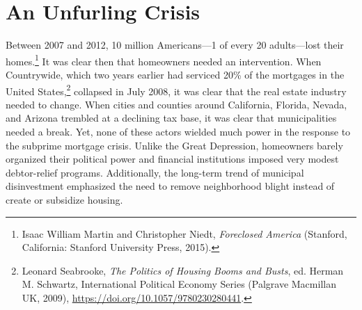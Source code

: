 \documentclass[12pt,oneside]{psthesis}
\begin{document}
\mainmatter %
\pagestyle{fancyplain} %
\doublespacing
\titleformat{\chapter}[display]{\normalfont\huge\bfseries\singlespacing}{\chaptertitlename\ \thechapter}{40pt}{\huge}
\titleformat{\section}{\singlespacing\normalfont\Large\bfseries}{\thesection}{1em}{}
\titleformat{\subsection}{\singlespacing\normalfont\large\bfseries}{\thesubsection}{1em}{}
\titleformat{\subsubsection}{\singlespacing\normalfont\normalsize\bfseries}{\thesubsubsection}{1em}{}

\hypertarget{actors-motive}{%
\chapter{An Unfurling Crisis}\label{actors-motive}}

Between 2007 and 2012, 10 million Americans---1 of every 20 adults---lost their homes.\footnote{Isaac William Martin and Christopher Niedt, \emph{Foreclosed America} (Stanford, California: Stanford University Press, 2015).}
It was clear then that homeowners needed an intervention.
When Countrywide, which two years earlier had serviced 20\% of the mortgages in the United States,\footnote{Leonard Seabrooke, \emph{The Politics of Housing Booms and Busts}, ed. Herman M. Schwartz, International Political Economy Series (Palgrave Macmillan UK, 2009), \url{https://doi.org/10.1057/9780230280441}.} collapsed in July 2008, it was clear that the real estate industry needed to change.
When cities and counties around California, Florida, Nevada, and Arizona trembled at a declining tax base, it was clear that municipalities needed a break.
Yet, none of these actors wielded much power in the response to the subprime mortgage crisis.
Unlike the Great Depression, homeowners barely organized their political power and financial institutions imposed very modest debtor-relief programs.
Additionally, the long-term trend of municipal disinvestment emphasized the need to remove neighborhood blight instead of create or subsidize housing.
\end{document}
